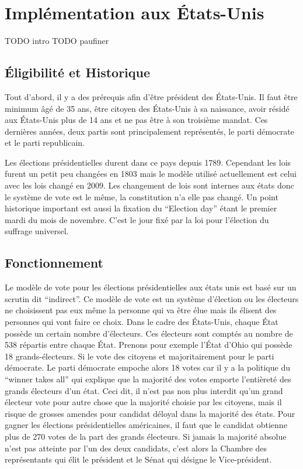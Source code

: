\documentclass[11pt,a4paper]{report}
\begin{document}
\section{Implémentation aux États-Unis}
TODO intro
\nocite{wiki:eleccoll}
TODO paufiner

\subsection{Éligibilité et Historique}
Tout d’abord, il y a des prérequis afin d’être président des États-Unis.
Il faut être minimum âgé de 35 ans, être citoyen des États-Unis à sa naissance, avoir résidé aux États-Unis plus de 14 ans et ne pas être à son troisième mandat.
Ces dernières années, deux partis sont principalement représentés, le parti démocrate et le parti republicain.

Les élections présidentielles durent dans ce pays depuis 1789.
Cependant les lois furent un petit peu changées en 1803 mais le modèle utilisé actuellement est celui avec les lois changé en 2009.
Les changement de lois sont internes aux états donc le système de vote est le même, la constitution n'a elle pas changé.
Un point historique important est aussi la fixation du “Election day” étant le premier mardi du mois de novembre.
C’est le jour fixé par la loi pour l'élection du suffrage universel.

\subsection{Fonctionnement}
Le modèle de vote pour les élections présidentielles aux états unis est basé sur un scrutin dit “indirect”.
Ce modèle de vote est un système d'élection ou les électeurs ne choisissent pas eux même la personne qui va être élue mais ils élisent des personnes qui vont faire ce choix.
Dans le cadre des États-Unis, chaque État possède un certain nombre d'électeurs.
Ces électeurs sont comptés au nombre de 538 répartis entre chaque État.
Prenons pour exemple l'État d'Ohio qui possède 18 grands-électeurs.
Si le vote des citoyens et majoritairement pour le parti démocrate.
Le parti démocrate empoche alors 18 votes car il y a la politique du “winner takes all” qui explique que la majorité des votes emporte l'entièreté des grands électeurs d’un état.
Ceci dit, il n’est pas non plus interdit qu’un grand électeur vote pour autre chose que la majorité choisie par les citoyens, mais il risque de grosses amendes pour candidat déloyal dans la majorité des états.
Pour gagner les élections présidentielles américaines, il faut que le candidat obtienne plus de 270 votes de la part des grands électeurs.
Si jamais la majorité absolue n’est pas atteinte par l’un des deux candidats, c’est alors la Chambre des représentants qui élit le président et le Sénat qui désigne le Vice-président.
\end{document}
